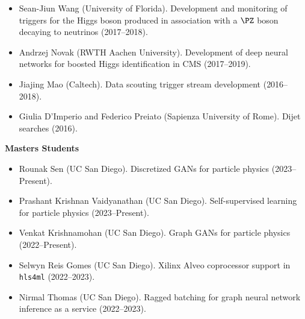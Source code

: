 \documentclass[11pt]{res}
\begin{document}
\begin{resume}
\begin{itemize}
    \item Sean-Jiun Wang (University of Florida). Development and monitoring of triggers for the Higgs boson produced in association with a $\PZ$ boson decaying to neutrinos ({2017--2018}).
    \item Andrzej Novak (RWTH Aachen University). Development of deep neural networks for boosted Higgs identification in CMS ({2017--2019}).
    \item Jiajing Mao (Caltech). Data scouting trigger stream development ({2016--2018}).
    \item Giulia D'Imperio and Federico Preiato (Sapienza University of Rome). Dijet searches ({2016}).
  \end{itemize}

  \textbf{Masters Students}
  \begin{itemize}
    \itemsep-0.3em
    \item Rounak Sen (UC San Diego). Discretized GANs for particle physics (2023--Present).
    \item Prashant Krishnan Vaidyanathan (UC San Diego). Self-supervised learning for particle physics  (2023--Present).
    \item Venkat Krishnamohan (UC San Diego). Graph GANs for particle physics ({2022--Present}).
    \item Selwyn Reis Gomes (UC San Diego). Xilinx Alveo coprocessor support in \texttt{hls4ml} ({2022--2023}).
    \item Nirmal Thomas (UC San Diego). Ragged batching for graph neural network inference as a service ({2022--2023}).
  \end{itemize}


\end{resume}
\end{document}
